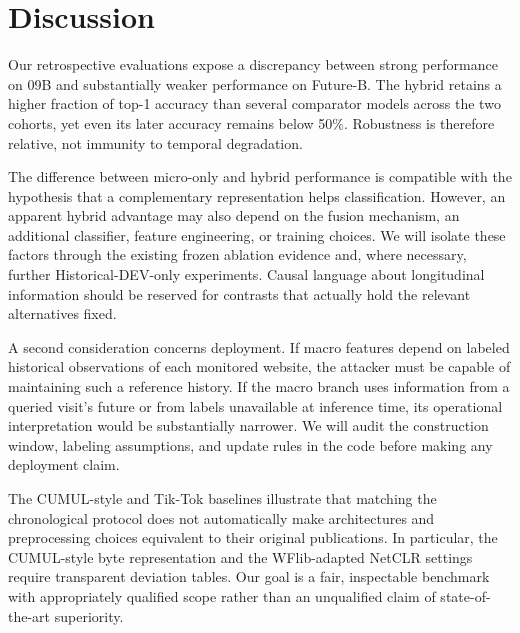 \section{Discussion}\label{sec:discussion}
Our retrospective evaluations expose a discrepancy between strong performance on 09B and substantially weaker performance on Future-B. The hybrid retains a higher fraction of top-1 accuracy than several comparator models across the two cohorts, yet even its later accuracy remains below 50\%. Robustness is therefore relative, not immunity to temporal degradation.

The difference between micro-only and hybrid performance is compatible with the hypothesis that a complementary representation helps classification. However, an apparent hybrid advantage may also depend on the fusion mechanism, an additional classifier, feature engineering, or training choices. We will isolate these factors through the existing frozen ablation evidence and, where necessary, further Historical-DEV-only experiments. Causal language about longitudinal information should be reserved for contrasts that actually hold the relevant alternatives fixed.

A second consideration concerns deployment. If macro features depend on labeled historical observations of each monitored website, the attacker must be capable of maintaining such a reference history. If the macro branch uses information from a queried visit's future or from labels unavailable at inference time, its operational interpretation would be substantially narrower. We will audit the construction window, labeling assumptions, and update rules in the code before making any deployment claim.

The CUMUL-style and Tik-Tok baselines illustrate that matching the chronological protocol does not automatically make architectures and preprocessing choices equivalent to their original publications. In particular, the CUMUL-style byte representation and the WFlib-adapted NetCLR settings require transparent deviation tables. Our goal is a fair, inspectable benchmark with appropriately qualified scope rather than an unqualified claim of state-of-the-art superiority.
